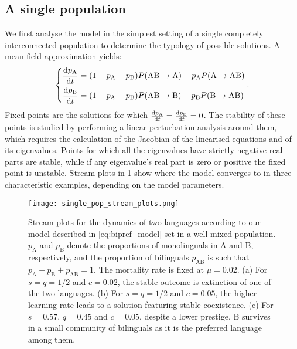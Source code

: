 \documentclass[../thesis.tex]{subfiles}
\begin{document}
\subsection{A single population}
We first analyse the model  in the
simplest setting of a single completely interconnected population to determine the
typology of possible solutions. A mean field approximation yields:
\begin{equation}
  \label{eq:dt_bipref_model}
  \left\{
  \begin{aligned}
    \dv{p_\text{A}}{t} &= (1 - p_\text{A} - p_\text{B}) P (\text{AB} \rightarrow \text{A})
        - p_\text{A} P (\text{A} \rightarrow \text{AB})
    \\
    \dv{p_\text{B}}{t} &= (1 - p_\text{A} - p_\text{B}) P (\text{AB} \rightarrow \text{B})
        - p_\text{B} P (\text{B} \rightarrow \text{AB})
  \end{aligned}
    \right. .
\end{equation}
Fixed points are the solutions for which $\dv{p_\text{A}}{t} = \dv{p_\text{B}}{t} = 0$.
The stability of these points is studied by performing a linear perturbation analysis
around them, which requires the calculation of the Jacobian of the linearised equations
and of its eigenvalues. Points for which all the eigenvalues have strictly negative real
parts are stable, while if any eigenvalue's real part is zero or positive the fixed
point is unstable. Stream plots in \cref{fig:stream_plots} show where the model
converges to in three characteristic examples, depending on the model parameters.
\begin{figure}[b!]
  \centering
  \texttt{[image: single\_pop\_stream\_plots.png]}
  \caption{Stream plots for the dynamics of two languages according to our model
  described in \cref{eq:bipref_model} set in a well-mixed population. $p_{\text{A}}$
  and $p_{\text{B}}$ denote the proportions of monolinguals in A and B, respectively,
  and the proportion of bilinguals $p_{\text{AB}}$ is such that $p_{\text{A}} +
  p_{\text{B}} + p_{\text{AB}} = 1$. The mortality rate is fixed at $\mu = 0.02$. (a)
  For $s = q = 1/2$ and $c=0.02$, the stable outcome is extinction of one of the two
  languages. (b) For $s = q = 1/2$ and $c = 0.05$, the higher learning rate leads to a
  solution featuring stable coexistence. (c) For $s = 0.57$, $q = 0.45$ and $c =
  0.05$, despite a lower prestige, B survives in a small community of bilinguals as
  it is the preferred language among them.}
  \label{fig:stream_plots}
\end{figure}
\end{document}
